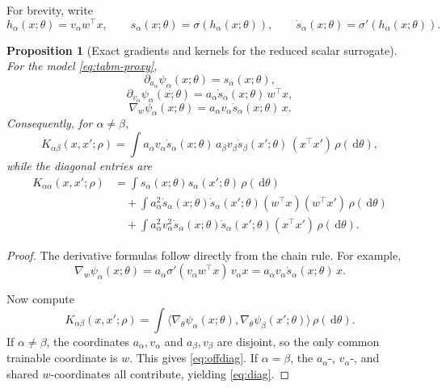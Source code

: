 \documentclass[11pt]{article}
\newtheorem{proposition}[theorem]{Proposition}
\theoremstyle{definition}
\newcommand{\dd}{\,\mathrm{d}}
\begin{document}
For brevity, write
\[
  h_\alpha(x;\theta)=v_\alpha w^\top x,
  \qquad
  s_\alpha(x;\theta)=\sigma(h_\alpha(x;\theta)),
  \qquad
  \dot{s}_\alpha(x;\theta)=\sigma'(h_\alpha(x;\theta)).
\]

\begin{proposition}[Exact gradients and kernels for the reduced scalar surrogate]
\label{prop:explicit-kernel}
For the model \eqref{eq:tabm-proxy},
\[
  \partial_{a_\alpha}\psi_\alpha(x;\theta)=s_\alpha(x;\theta),
\]
\[
  \partial_{v_\alpha}\psi_\alpha(x;\theta)
  =
  a_\alpha \dot{s}_\alpha(x;\theta)\, w^\top x,
\]
\[
  \nabla_w \psi_\alpha(x;\theta)
  =
  a_\alpha v_\alpha \dot{s}_\alpha(x;\theta)\, x.
\]
Consequently, for $\alpha \neq \beta$,
\begin{equation}
  K_{\alpha\beta}(x,x';\rho)
  =
  \int
  a_\alpha v_\alpha \dot{s}_\alpha(x;\theta)\,
  a_\beta v_\beta \dot{s}_\beta(x';\theta)\,
  (x^\top x')
  \,\rho(\dd \theta),
  \label{eq:offdiag}
\end{equation}
while the diagonal entries are
\begin{align}
  K_{\alpha\alpha}(x,x';\rho)
  &=
  \int
  s_\alpha(x;\theta)s_\alpha(x';\theta)\,\rho(\dd \theta)
  \nonumber\\
  &\quad
  +
  \int
  a_\alpha^2 \dot{s}_\alpha(x;\theta)\dot{s}_\alpha(x';\theta)
  (w^\top x)(w^\top x')
  \,\rho(\dd \theta)
  \nonumber\\
  &\quad
  +
  \int
  a_\alpha^2 v_\alpha^2 \dot{s}_\alpha(x;\theta)\dot{s}_\alpha(x';\theta)
  (x^\top x')
  \,\rho(\dd \theta).
  \label{eq:diag}
\end{align}
\end{proposition}

\begin{proof}
The derivative formulas follow directly from the chain rule.
For example,
\[
  \nabla_w \psi_\alpha(x;\theta)
  =
  a_\alpha \sigma'(v_\alpha w^\top x)\, v_\alpha x
  =
  a_\alpha v_\alpha \dot{s}_\alpha(x;\theta)\, x.
\]

Now compute
\[
  K_{\alpha\beta}(x,x';\rho)
  =
  \int
  \langle \nabla_\theta \psi_\alpha(x;\theta),\nabla_\theta \psi_\beta(x';\theta) \rangle
  \,\rho(\dd \theta).
\]
If $\alpha\neq\beta$, the coordinates $a_\alpha,v_\alpha$ and $a_\beta,v_\beta$ are disjoint, so the only common trainable coordinate is $w$.
This gives \eqref{eq:offdiag}.
If $\alpha=\beta$, the $a_\alpha$-, $v_\alpha$-, and shared $w$-coordinates all contribute, yielding \eqref{eq:diag}.
\end{proof}
\end{document}

